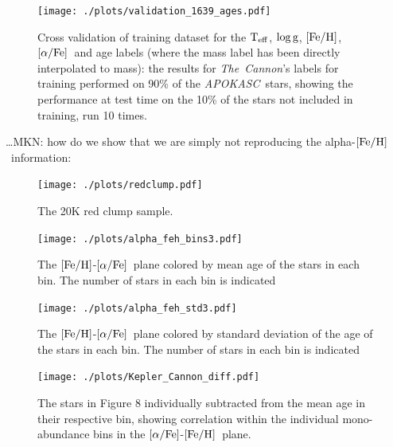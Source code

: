 \documentclass[12pt, preprint]{aastex}
\newcommand{\project}[1]{\textsl{#1}}
\newcommand{\tc}{\project{The~Cannon}}
\newcommand{\apokasc}{\project{APOKASC}}
\newcommand{\teff}{\mbox{$\rm T_{eff}$}}
\newcommand{\feh}{\mbox{$\rm [Fe/H]$}}
\newcommand{\alphafe}{\mbox{$\rm [\alpha/Fe]$}}
\newcommand{\logg}{\mbox{$\rm \log g$}}
\begin{document}
\begin{figure}[p!]
\centering
        \texttt{[image: ./plots/validation\_1639\_ages.pdf]}
  \caption{Cross validation of training dataset for the \teff, \logg, \feh, \alphafe\ and age labels (where the mass label has been directly interpolated to mass): the results for \tc's labels for training performed on 90\% of the \apokasc\ stars, showing the performance at test time on the 10\% of the stars not included in training, run 10 times.}
\label{fig:validation}
\end{figure}


\ldots MKN: how do we show that we are simply not reproducing the alpha-\feh\ information:

\begin{figure}[p!]
\centering
 \texttt{[image: ./plots/redclump.pdf]}
    \caption{The 20K red clump sample.}
\label{fig:alphabins}
\end{figure}


\begin{figure}[p!]
\centering
 \texttt{[image: ./plots/alpha\_feh\_bins3.pdf]}
    \caption{The \feh-\alphafe\ plane colored by mean age of the stars in each bin. The number of stars in each bin is indicated }
\label{fig:alphabins}
\end{figure}

\begin{figure}[p!]
\centering
 \texttt{[image: ./plots/alpha\_feh\_std3.pdf]}
    \caption{The \feh-\alphafe\ plane colored by standard deviation of the age of the stars in each bin. The number of stars in each bin is indicated }
\label{fig:alphabins}
\end{figure}

\begin{figure}[p!]
\centering
 \texttt{[image: ./plots/Kepler\_Cannon\_diff.pdf]}
    \caption{The stars in Figure 8 individually subtracted from the mean age in their respective bin, showing correlation within the individual mono-abundance bins in the \alphafe-\feh\ plane. }
\label{fig:alphabins}
\end{figure}
\end{document}
